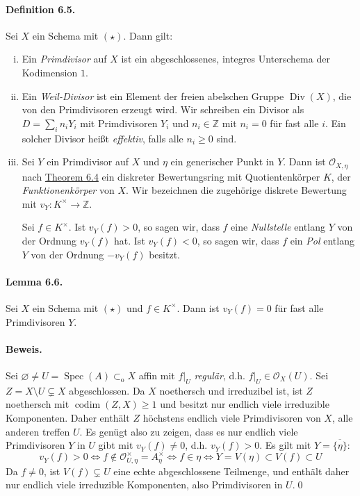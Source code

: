 \paragraph{Definition 6.5.}\label{6.5} Sei $X$ ein Schema mit $(\star)$. Dann gilt:
\begin{enumerate}[(i)]
\item Ein \textit{Primdivisor} auf $X$ ist ein abgeschlossenes, integres Unterschema der Kodimension $1$.
\item Ein \textit{Weil-Divisor} ist ein Element der freien abelschen Gruppe $\operatorname{Div}(X)$, die von den Primdivisoren erzeugt wird. Wir schreiben ein Divisor als $D=\sum_i n_iY_i$ mit Primdivisoren $Y_i$ und $n_i\in\mathbb{Z}$ mit $n_i=0$ für fast alle $i$. Ein solcher Divisor heißt \textit{effektiv}, falls alle $n_i\geq 0$ sind.
\item Sei $Y$ ein Primdivisor auf $X$ und $\eta$ ein generischer Punkt in $Y$. Dann ist $\mathcal{O}_{X,\eta}$ nach \hyperref[6.4]{Theorem 6.4} ein diskreter Bewertungsring mit Quotientenkörper $K$, der \textit{Funktionenkörper} von $X$. Wir bezeichnen die zugehörige diskrete Bewertung mit  $v_Y:K^\times\to\mathbb{Z}$.

Sei $f\in K^\times$. Ist $v_Y(f)>0$, so sagen wir, dass $f$ eine \textit{Nullstelle} entlang $Y$ von der Ordnung $v_Y(f)$ hat. Ist $v_Y(f)<0$, so sagen wir, dass $f$ ein \textit{Pol} entlang $Y$ von der Ordnung $-v_Y(f)$ besitzt.
\end{enumerate}

\paragraph{Lemma 6.6.}\label{6.6} Sei $X$ ein Schema mit $(\star)$ und $f\in K^\times$. Dann ist $v_Y(f)=0$ für fast alle Primdivisoren $Y$.

\paragraph{Beweis.} Sei $\varnothing \neq U = \operatorname{Spec}(A)\subset_\text{o}X$ affin mit $f|_U$ \textit{regulär}, d.h. $f|_U\in\mathcal{O}_X(U)$. Sei $Z=X\setminus U\subsetneq X$ abgeschlossen. Da $X$ noethersch und irreduzibel ist, ist $Z$ noethersch mit $\operatorname{codim}(Z,X)\geq 1$ und besitzt nur endlich viele irreduzible Komponenten. Daher enthält $Z$ höchstens endlich viele Primdivisoren von $X$, alle anderen treffen $U$. Es genügt also zu zeigen, dass es nur endlich viele Primdivisoren $Y$ in $U$ gibt mit $v_Y(f)\neq 0$, d.h. $v_Y(f)>0$. Es gilt mit $Y=\overline{\{ \eta\}}$:
\[v_Y(f)>0\iff f\not\in\mathcal{O}_{U,\eta}^\times=A_\eta^\times\iff f\in\eta\iff Y=V(\eta)\subset V(f)\subset U \]
Da $f\neq 0$, ist $V(f)\subsetneq U$ eine echte abgeschlossene Teilmenge, und enthält daher nur endlich viele irreduzible Komponenten, also Primdivisoren in $U$.\qed

